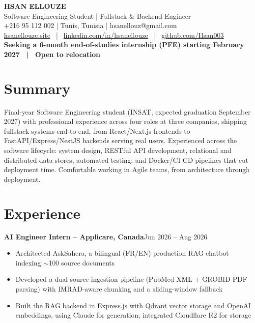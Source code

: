\documentclass[10pt,a4paper]{article}
\newcommand{\entry}[2]{\vspace{1pt}\noindent\textbf{#1}\hfill{\color{muted}#2}\par}
\begin{document}
\begin{center}
  {\LARGE\bfseries HSAN ELLOUZE}\\[2pt]
  {\color{muted} Software Engineering Student | Fullstack \& Backend Engineer}\\[2pt]
  {\footnotesize +216 95 112 002 | Tunis, Tunisia | hsanellouz@gmail.com}\\[1pt]
  {\footnotesize \href{https://hsanellouze.site}{hsanellouze.site} \ | \ \href{https://linkedin.com/in/hsanellouze}{linkedin.com/in/hsanellouze} \ | \ \href{https://github.com/Hsan003}{github.com/Hsan003}}\\[3pt]
  {\footnotesize\bfseries Seeking a 6-month end-of-studies internship (PFE) starting February 2027 \ | \ Open to relocation}
\end{center}

\section{Summary}
Final-year Software Engineering student (INSAT, expected graduation September 2027) with professional experience across four roles at three companies, shipping fullstack systems end-to-end, from React/Next.js frontends to FastAPI/Express/NestJS backends serving real users. Experienced across the software lifecycle: system design, RESTful API development, relational and distributed data stores, automated testing, and Docker/CI-CD pipelines that cut deployment time. Comfortable working in Agile teams, from architecture through deployment.

\section{Experience}
\entry{AI Engineer Intern -- Applicare, Canada}{Jun 2026 -- Aug 2026}
\begin{itemize}
  \item Architected AskSahera, a bilingual (FR/EN) production RAG chatbot indexing $\sim$100 source documents
  \item Developed a dual-source ingestion pipeline (PubMed XML + GROBID PDF parsing) with IMRAD-aware chunking and a sliding-window fallback
  \item Built the RAG backend in Express.js with Qdrant vector storage and OpenAI embeddings, using Claude for generation; integrated Cloudflare R2 for storage
\end{itemize}
\end{document}
